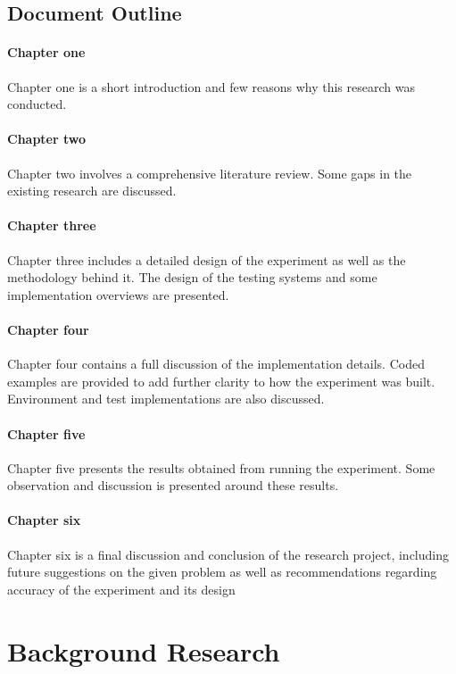 \documentclass[oneside,12pt]{book}
\begin{document}
\section{Document Outline}
\subsubsection{Chapter one}
Chapter one is a short introduction and few reasons why this research was conducted.
\subsubsection{Chapter two}
Chapter two involves a comprehensive literature review. Some gaps in the existing research  are discussed.
\subsubsection{Chapter three}
Chapter three includes a detailed design of the experiment as well as the methodology behind it. The design of the testing systems and some implementation overviews are presented. 
\subsubsection{Chapter four}
Chapter four contains a full discussion of the implementation details. Coded examples are provided to add further clarity to how the experiment was built. Environment and test implementations are also discussed. 
\subsubsection{Chapter five}
Chapter five presents the results obtained from running the experiment. Some observation and discussion is presented around these results. 
\subsubsection{Chapter six}
Chapter six is a final discussion and conclusion of the research project, including future suggestions on the given problem as well as recommendations regarding accuracy of the experiment and its design

\chapter{Background Research}
\end{document}
